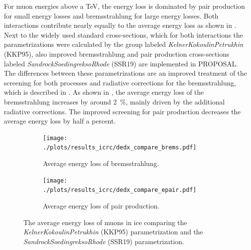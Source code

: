 For muon energies above a TeV, the energy loss is dominated by pair production for small energy losses and bremsstrahlung for large energy losses.
Both interactions contribute nearly equally to the average energy loss as shown in .
Next to the widely used standard cross-sections, which for both interactions the parametrizations were calculated by the group labeled \textit{KelnerKokoulinPetrukhin} (KKP95), also improved bremsstrahlung and pair production cross-sections labeled \textit{SandrockSoedingreksoRhode} (SSR19) are implemented in PROPOSAL.
The differences between these parametrizations are an improved treatment of the screening for both processes and radiative corrections for the bremsstrahlung, which is described in .
As shown in , the average energy loss of the bremsstrahlung increases by around \SI{2}{\%}, mainly driven by the additional radiative corrections.
The improved screening for pair production decreases the average energy loss by half a percent.
\begin{figure}
    \centering
    \begin{subfigure}[t]{0.47\textwidth}
        \centering
        \texttt{[image: ./plots/results\_icrc/dedx\_compare\_brems.pdf]}
        \caption{Average energy loss of bremsstrahlung.}
        \label{fig:dedx_brems_kkp_ssr}
    \end{subfigure}
    \hfill
    \begin{subfigure}[t]{0.47\textwidth}
        \centering
        \texttt{[image: ./plots/results\_icrc/dedx\_compare\_epair.pdf]}
        \caption{Average energy loss of pair production.}
        \label{fig:dedx_epair_kkp_ssr}
    \end{subfigure}
    \caption{The average energy loss of muons in ice comparing the \textit{KelnerKokoulinPetrukhin} (KKP95) parametrization and the \textit{SandrockSoedingreksoRhode} (SSR19) parametrization.}
    \label{fig:dedx_kkp_ssr}
\end{figure}

